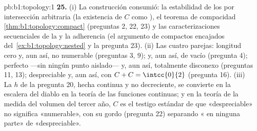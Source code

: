 \begin{solution}{pb:b1:topology:1}
\textbf{25.} (i) La construcción consumió: la estabilidad de los
 por intersección arbitraria (la existencia de $C$ como
), el teorema de compacidad
\cref{thm:b1:topology:compact} (preguntas 2, 22, 23) y las
caracterizaciones secuenciales de la  y la adherencia (el
argumento de compactos encajados del~\cref{ex:b1:topology:nested} y
la pregunta 23). (ii) Las cuatro parejas: longitud cero y, aun así,
no numerable (preguntas 3, 9);  y, aun así, de 
vacío (pregunta 4); perfecto ---sin ningún punto aislado--- y, aun
así, totalmente disconexo (preguntas 11, 13); despreciable y, aun
así, con $C + C = \intcc{0}{2}$ (pregunta 16). (iii) La 
$h$ de la pregunta 20, hecha continua y no decreciente, se convierte
en la escalera del diablo en la teoría de las funciones continuas; y
en la teoría de la medida del volumen del tercer año, $C$ es el
testigo estándar de que «despreciable» no significa «numerable», con
su  gordo (pregunta 22) separando « en ninguna parte» de
«despreciable».
\end{solution}
